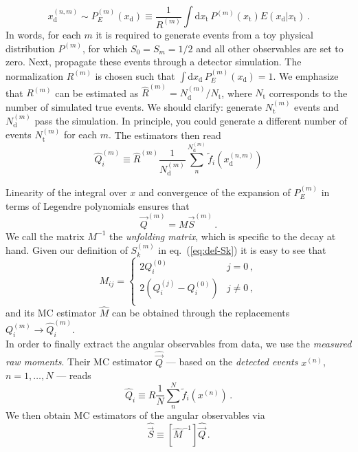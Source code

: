 \documentclass[aps,nofootinbib,preprintnumbers,prd,twocolumn]{revtex4-1}
\newcommand{\est}[1]{\widehat{#1}}
\newcommand{\refeq}[1]{eq.~(\ref{eq:#1})}
\newcommand{\rmdx}[1]{\mbox{d} #1 \,} %
\newcommand{\subd}{_{\text{d}}}
\newcommand{\subt}{_{\text{t}}}
\newcommand{\vecest}[1]{\widehat{\vec{#1}}}
\newcommand{\xd}{x\subd}
\newcommand{\xt}{x\subt}
\newcommand{\Ekernel}{E(\xd|\xt)}
\newcommand{\fred}[1]{{\color{brown!85!black}#1}}
\begin{document}
\begin{equation}
    x_\text{d}^{(n,m)} \sim P_E^{(m)}(\xd) \equiv \frac{1}{R^{(m)}} \int \rmdx{\xt} P^{(m)}(\xt) \Ekernel\,.
\end{equation}
In words, for each $m$ it is required to generate events from
a toy physical distribution $P^{(m)}$, for which $S_0 = S_m=1/2$ and all other
observables are set to zero. Next, propagate these events through
a detector simulation. The normalization $R^{(m)}$ is chosen such
that $\int \rmdx{\xd} P_E^{(m)}(\xd)  = 1$.  We emphasize that
$R^{(m)}$ can be estimated as $\est{R}^{(m)} = N_\text{d}^{(m)} /
N_\text{t}$, where $N_\text{t}$ corresponds to the number of
simulated true events. \fred{We should clarify: generate $N_\text{t}^{(m)}$ events and $N_\text{d}^{(m)}$ pass the simulation. In principle, you could generate a different number of events $N_\text{t}^{(m)}$ for each $m$.  } The estimators then read
\begin{equation}
    \est{Q}_i^{(m)} \equiv \est{R}^{(m)} \frac{1}{N_\text{d}^{(m)}} \sum_n^{N_\text{d}^{(m)}} \tilde{f}_i(x_\text{d}^{(n,m)})
\end{equation}

Linearity of the integral over $x$ and convergence of the expansion of
$P_E^{(m)}$ in terms of Legendre polynomials ensures that
\begin{equation}
    \vec{Q}^{(m)} = M \vec{S}^{(m)}\,.
\end{equation}
We call the matrix $M^{-1}$ the \emph{unfolding matrix},
which is specific to the decay at hand.
Given our definition of $S_k^{(m)}$ in
\refeq{def-Sk} it is easy to see that
\begin{equation}
    M_{ij} = \begin{cases}
        2 Q_i^{(0)}                          & j = 0\,,\\
        2\left(Q_i^{(j)} - Q_i^{(0)}\right)  & j \neq 0\,,\\
    \end{cases}
\end{equation}
and its MC estimator $\est{M}$  can be obtained through the replacements $Q_i^{(m)} \to \est{Q}_i^{(m)}$.\\

In order to finally extract the angular observables from data, we use the \emph{measured raw moments}. Their MC estimator
$\vecest{Q}$ --- based on the \emph{detected events} $x^{(n)}$, $n=1,\dots,N$ --- reads
\begin{equation}
    \est{Q}_i \equiv R \frac{1}{N} \sum_n^N \tilde{f}_i(x^{(n)})\,.
\end{equation}
We then obtain MC estimators of the angular observables via
\begin{equation}
    \label{eq:estS}
    \vecest{S} \equiv \left[\est{M}^{-1}\right] \vecest{Q}\,.
\end{equation}
\end{document}
